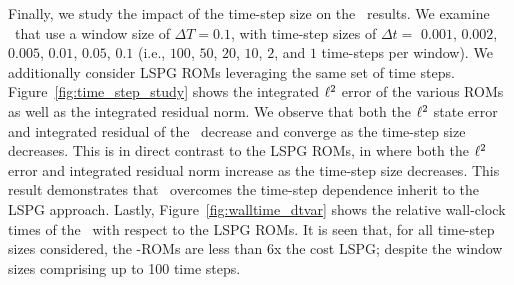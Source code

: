 Finally, we study the impact of the time-step size on the \methodAcronymROM\ results. We examine \methodAcronymROMs\ that use a
window size of $\Delta T = 0.1$, with time-step sizes of $\Delta t =$  $0.001$, $0.002$, $0.005$, $0.01$, $0.05$, $0.1$ (i.e.,  
$100$, $50$, $20$, $10$, $2$, and $1$ time-steps per window). We additionally 
consider LSPG ROMs leveraging the same set of time steps. Figure~\ref{fig:time_step_study} shows the integrated $\ell^2$ error 
of the various ROMs as well as the integrated residual norm. We observe that both the $\ell^2$ state error and integrated residual 
of the \methodAcronymROMs\ decrease and converge as the time-step size decreases. This is in direct contrast to the LSPG ROMs, in where both the $\ell^2$ 
error and integrated residual norm increase as the time-step size decreases. This result 
demonstrates that \methodAcronym\ overcomes the time-step dependence inherit to the LSPG approach. Lastly, Figure~\ref{fig:walltime_dtvar}
shows the relative wall-clock times of the \methodAcronymROMs\ with respect to the LSPG ROMs. It is seen that, for all time-step sizes considered, the \methodAcronym-ROMs 
are less than 6x the cost LSPG; despite the window sizes comprising up to 100 time steps. 
